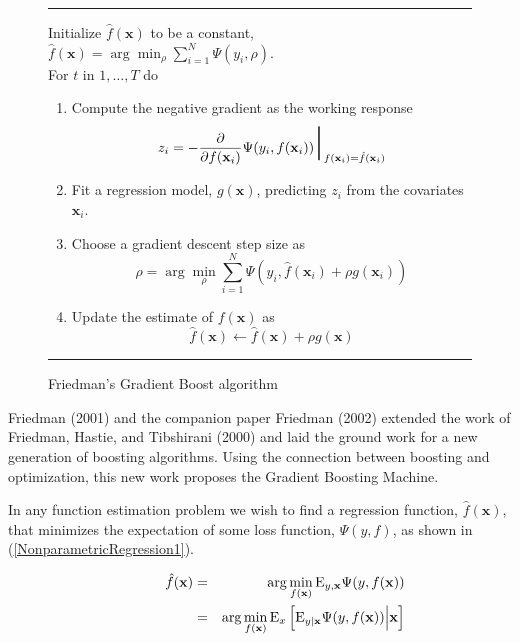 \documentclass{article}
\newcommand{\EV}{\mathrm{E}}
\newcommand{\aRule}{\begin{center} \rule{5in}{1mm} \end{center}}
\begin{document}
\begin{figure} 
  \aRule Initialize $\hat f(\mathbf{x})$ to be a constant, $\hat f(\mathbf{x}) = \arg \min_{\rho} \sum_{i=1}^N \Psi(y_i,\rho)$. \\
  For $t$ in $1,\ldots,T$ do
\begin{enumerate} 
\item Compute the negative gradient as the working response
    \begin{equation}
    z_i = -\frac{\partial}{\partial f(\mathbf{x}_i)} \Psi(y_i,f(\mathbf{x}_i)) \mbox{\Huge $|$}_{f(\mathbf{x}_i)=\hat f(\mathbf{x}_i)}
    \end{equation}
\item Fit a regression model, $g(\mathbf{x})$, predicting $z_i$ from the covariates $\mathbf{x}_i$. \item Choose a gradient descent step size as
    \begin{equation}
    \rho = \arg \min_{\rho} \sum_{i=1}^N \Psi(y_i,\hat f(\mathbf{x}_i)+\rho g(\mathbf{x}_i))
    \end{equation}
\item Update the estimate of $f(\mathbf{x})$ as
    \begin{equation}
    \hat f(\mathbf{x}) \leftarrow \hat f(\mathbf{x}) + \rho g(\mathbf{x})
    \end{equation}
\end{enumerate} \aRule \caption{Friedman's Gradient Boost algorithm} \label{fig:GradientBoost} \end{figure}

Friedman (2001) and the companion paper Friedman (2002) extended the
work of Friedman, Hastie, and Tibshirani (2000) and laid the ground
work for a new generation of boosting algorithms. Using the connection
between boosting and optimization, this new work proposes the Gradient
Boosting Machine.

In any function estimation problem we wish to find a regression
function, $\hat f(\mathbf{x})$, that minimizes the expectation of some
loss function, $\Psi(y,f)$, as shown in
(\ref{NonparametricRegression1}).

\begin{eqnarray}
\hspace{0.5in}
\hat f(\mathbf{x}) &=& \arg \min_{f(\mathbf{x})} \EV_{y,\mathbf{x}} \Psi(y,f(\mathbf{x})) \nonumber \\ \label{NonparametricRegression1}
&=& \arg \min_{f(\mathbf{x})} \EV_x \left[ \EV_{y|\mathbf{x}} \Psi(y,f(\mathbf{x})) \Big| \mathbf{x} \right]
\end{eqnarray}
\end{document}
